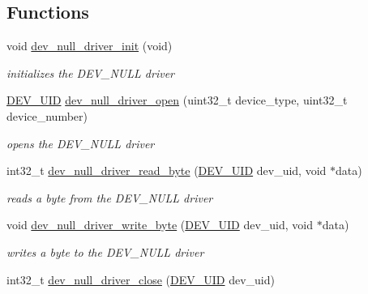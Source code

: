 \subsection*{Functions}
\begin{CompactItemize}
\item 
\hypertarget{group___d_e_v___n_u_l_l___d_r_i_v_e_r_g6f8f1bd26f17b5b9cd97a663fc6506f8}{
void \hyperlink{group___d_e_v___n_u_l_l___d_r_i_v_e_r_g6f8f1bd26f17b5b9cd97a663fc6506f8}{dev\_\-null\_\-driver\_\-init} (void)}
\label{group___d_e_v___n_u_l_l___d_r_i_v_e_r_g6f8f1bd26f17b5b9cd97a663fc6506f8}

\begin{CompactList}\small\item\em initializes the DEV\_\-NULL driver \item\end{CompactList}\item 
\hyperlink{group___d_e_v_i_c_e___a_p_i_g9f427f7fc1dc07b788af60c2aaa6b8d3}{DEV\_\-UID} \hyperlink{group___d_e_v___n_u_l_l___d_r_i_v_e_r_g19420164fed0b4ab3b5c4fc75585b582}{dev\_\-null\_\-driver\_\-open} (uint32\_\-t device\_\-type, uint32\_\-t device\_\-number)
\begin{CompactList}\small\item\em opens the DEV\_\-NULL driver \item\end{CompactList}\item 
int32\_\-t \hyperlink{group___d_e_v___n_u_l_l___d_r_i_v_e_r_g2ddfdd67728b79b4672d1549f513dfc5}{dev\_\-null\_\-driver\_\-read\_\-byte} (\hyperlink{group___d_e_v_i_c_e___a_p_i_g9f427f7fc1dc07b788af60c2aaa6b8d3}{DEV\_\-UID} dev\_\-uid, void $\ast$data)
\begin{CompactList}\small\item\em reads a byte from the DEV\_\-NULL driver \item\end{CompactList}\item 
void \hyperlink{group___d_e_v___n_u_l_l___d_r_i_v_e_r_g37b6936dc7965e224e2c2977a905ed8f}{dev\_\-null\_\-driver\_\-write\_\-byte} (\hyperlink{group___d_e_v_i_c_e___a_p_i_g9f427f7fc1dc07b788af60c2aaa6b8d3}{DEV\_\-UID} dev\_\-uid, void $\ast$data)
\begin{CompactList}\small\item\em writes a byte to the DEV\_\-NULL driver \item\end{CompactList}\item 
int32\_\-t \hyperlink{group___d_e_v___n_u_l_l___d_r_i_v_e_r_gbac6c3a551684ff0db74eb04020ebb26}{dev\_\-null\_\-driver\_\-close} (\hyperlink{group___d_e_v_i_c_e___a_p_i_g9f427f7fc1dc07b788af60c2aaa6b8d3}{DEV\_\-UID} dev\_\-uid)
\end{CompactItemize}


